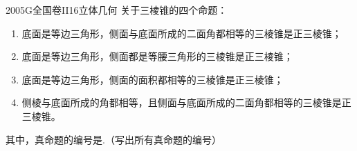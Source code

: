 
\begin{problem}{2005}{G}{全国卷II}{16}{立体几何}
关于三棱锥的四个命题：
\begin{enumerate}
\item 底面是等边三角形，侧面与底面所成的二面角都相等的三棱锥是正三棱锥；
\item 底面是等边三角形，侧面都是等腰三角形的三棱锥是正三棱锥；
\item 底面是等边三角形，侧面的面积都相等的三棱锥是正三棱锥；
\item 侧棱与底面所成的角都相等，且侧面与底面所成的二面角都相等的三棱锥是正三棱锥。
\end{enumerate}
其中，真命题的编号是\underline{\hspace{4em}}.（写出所有真命题的编号）
\end{problem}

\begin{answer}

\end{answer}

\begin{solutions}

\end{solutions}